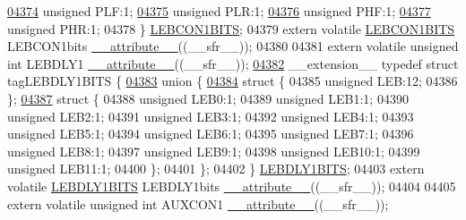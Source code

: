 \begin{DoxyCode}
\hypertarget{a00015_source_l04374}{}\hyperlink{a00014_ab72be8b35e01107182afb8e9733d72bb}{04374}   \textcolor{keywordtype}{unsigned} PLF:1;
\hypertarget{a00015_source_l04375}{}\hyperlink{a00014_a5f690459b53fc81b46dbbac226cecb25}{04375}   \textcolor{keywordtype}{unsigned} PLR:1;
\hypertarget{a00015_source_l04376}{}\hyperlink{a00014_a4ac425e6c1575269dfa33a0373584fff}{04376}   \textcolor{keywordtype}{unsigned} PHF:1;
\hypertarget{a00015_source_l04377}{}\hyperlink{a00014_ae02a9c6926c3a1feac21cec18a520e4a}{04377}   \textcolor{keywordtype}{unsigned} PHR:1;
04378 \} \hyperlink{a00014_de/d7c/a00576}{LEBCON1BITS};
04379 \textcolor{keyword}{extern} \textcolor{keyword}{volatile} \hyperlink{a00014_de/d7c/a00576}{LEBCON1BITS} LEBCON1bits \hyperlink{a00015_a493c46f03454991ccc5aa7a6e1dfb2a7}{\_\_attribute\_\_}((\_\_sfr\_\_));
04380 
04381 \textcolor{keyword}{extern} \textcolor{keyword}{volatile} \textcolor{keywordtype}{unsigned} \textcolor{keywordtype}{int}  LEBDLY1 \hyperlink{a00015_a493c46f03454991ccc5aa7a6e1dfb2a7}{\_\_attribute\_\_}((\_\_sfr\_\_));
\hypertarget{a00015_source_l04382}{}\hyperlink{a00014}{04382} \_\_extension\_\_ \textcolor{keyword}{typedef} \textcolor{keyword}{struct }tagLEBDLY1BITS \{
\hypertarget{a00015_source_l04383}{}\hyperlink{a00015}{04383}   \textcolor{keyword}{union }\{
\hypertarget{a00015_source_l04384}{}\hyperlink{a00015}{04384}     \textcolor{keyword}{struct }\{
04385       \textcolor{keywordtype}{unsigned} LEB:12;
04386     \};
\hypertarget{a00015_source_l04387}{}\hyperlink{a00015}{04387}     \textcolor{keyword}{struct }\{
04388       \textcolor{keywordtype}{unsigned} LEB0:1;
04389       \textcolor{keywordtype}{unsigned} LEB1:1;
04390       \textcolor{keywordtype}{unsigned} LEB2:1;
04391       \textcolor{keywordtype}{unsigned} LEB3:1;
04392       \textcolor{keywordtype}{unsigned} LEB4:1;
04393       \textcolor{keywordtype}{unsigned} LEB5:1;
04394       \textcolor{keywordtype}{unsigned} LEB6:1;
04395       \textcolor{keywordtype}{unsigned} LEB7:1;
04396       \textcolor{keywordtype}{unsigned} LEB8:1;
04397       \textcolor{keywordtype}{unsigned} LEB9:1;
04398       \textcolor{keywordtype}{unsigned} LEB10:1;
04399       \textcolor{keywordtype}{unsigned} LEB11:1;
04400     \};
04401   \};
04402 \} \hyperlink{a00014_dc/d4a/a00579}{LEBDLY1BITS};
04403 \textcolor{keyword}{extern} \textcolor{keyword}{volatile} \hyperlink{a00014_dc/d4a/a00579}{LEBDLY1BITS} LEBDLY1bits \hyperlink{a00015_a493c46f03454991ccc5aa7a6e1dfb2a7}{\_\_attribute\_\_}((\_\_sfr\_\_));
04404 
04405 \textcolor{keyword}{extern} \textcolor{keyword}{volatile} \textcolor{keywordtype}{unsigned} \textcolor{keywordtype}{int}  AUXCON1 \hyperlink{a00015_a493c46f03454991ccc5aa7a6e1dfb2a7}{\_\_attribute\_\_}((\_\_sfr\_\_));

\end{DoxyCode}

